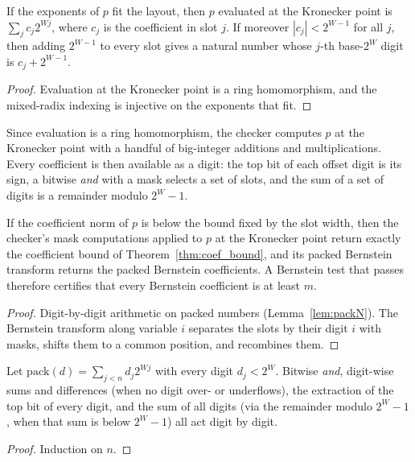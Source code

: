 \begin{lemma}
\label{lem:kronecker}
\leanok
{}
If the exponents of $p$ fit the layout, then $p$ evaluated at the Kronecker point is
$\sum_j c_j 2^{W j}$, where $c_j$ is the coefficient in slot $j$. If moreover
$|c_j| < 2^{W-1}$ for all $j$, then adding $2^{W-1}$ to every slot gives a natural number
whose $j$-th base-$2^W$ digit is $c_j + 2^{W-1}$.
\end{lemma}
\begin{proof}
\leanok
Evaluation at the Kronecker point is a ring homomorphism, and the mixed-radix indexing
is injective on the exponents that fit.
\end{proof}

Since evaluation is a ring homomorphism, the checker computes $p$ at the Kronecker
point with a handful of big-integer additions and multiplications. Every coefficient
is then available as a digit: the top bit of each offset digit is its sign, a bitwise
\emph{and} with a mask selects a set of slots, and the sum of a set of digits is a
remainder modulo $2^W - 1$.

\begin{lemma}
\label{lem:packed_bounds}
\leanok
{}
If the coefficient norm of $p$ is below the bound fixed by the slot width, then the
checker's mask computations applied to $p$ at the Kronecker point return exactly the
coefficient bound of Theorem~\ref{thm:coef_bound}, and its packed Bernstein transform
returns the packed Bernstein coefficients. A Bernstein test that passes therefore
certifies that every Bernstein coefficient is at least $m$.
\end{lemma}
\begin{proof}
\leanok
{}
Digit-by-digit arithmetic on packed numbers (Lemma~\ref{lem:packN}). The Bernstein
transform along variable $i$ separates the slots by their digit $i$ with masks, shifts
them to a common position, and recombines them.
\end{proof}

\begin{lemma}
\label{lem:packN}
\leanok
Let $\mathrm{pack}(d) = \sum_{j < n} d_j 2^{W j}$ with every digit $d_j < 2^W$. Bitwise
\emph{and}, digit-wise sums and differences (when no digit over- or underflows), the
extraction of the top bit of every digit, and the sum of all digits (via the remainder
modulo $2^W - 1$, when that sum is below $2^W - 1$) all act digit by digit.
\end{lemma}
\begin{proof}
\leanok
Induction on $n$.
\end{proof}


